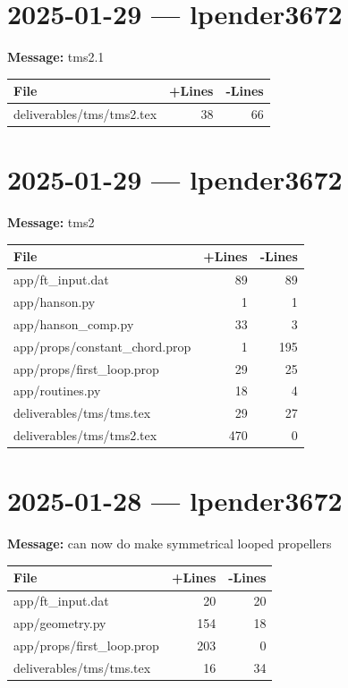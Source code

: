 \documentclass{article}
\begin{document}
\section*{2025-01-29 --- lpender3672}
\textbf{Message:} tms2.1

\begin{longtable}{|p{10cm}|r|r|}
\hline \textbf{File} & \textbf{+Lines} & \textbf{-Lines} \\
\hline
deliverables/tms/tms2.tex & 38 & 66 \\
\hline
\end{longtable}

\section*{2025-01-29 --- lpender3672}
\textbf{Message:} tms2

\begin{longtable}{|p{10cm}|r|r|}
\hline \textbf{File} & \textbf{+Lines} & \textbf{-Lines} \\
\hline
app/ft\_input.dat & 89 & 89 \\
\hline
app/hanson.py & 1 & 1 \\
\hline
app/hanson\_comp.py & 33 & 3 \\
\hline
app/props/constant\_chord.prop & 1 & 195 \\
\hline
app/props/first\_loop.prop & 29 & 25 \\
\hline
app/routines.py & 18 & 4 \\
\hline
deliverables/tms/tms.tex & 29 & 27 \\
\hline
deliverables/tms/tms2.tex & 470 & 0 \\
\hline
\end{longtable}

\section*{2025-01-28 --- lpender3672}
\textbf{Message:} can now do make symmetrical looped propellers

\begin{longtable}{|p{10cm}|r|r|}
\hline \textbf{File} & \textbf{+Lines} & \textbf{-Lines} \\
\hline
app/ft\_input.dat & 20 & 20 \\
\hline
app/geometry.py & 154 & 18 \\
\hline
app/props/first\_loop.prop & 203 & 0 \\
\hline
deliverables/tms/tms.tex & 16 & 34 \\
\hline
\end{longtable}
\end{document}
